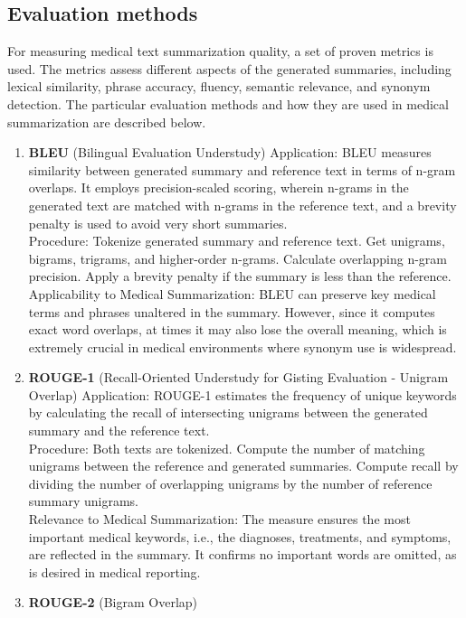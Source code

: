 \subsection{Evaluation methods}
For measuring medical text summarization quality, a set of proven metrics is used. The metrics assess different aspects of the generated summaries, including lexical similarity, phrase accuracy, fluency, semantic relevance, and synonym detection. The particular evaluation methods and how they are used in medical summarization are described below.
\begin{enumerate}

\item \textbf{BLEU} (Bilingual Evaluation Understudy)
Application: BLEU measures similarity between generated summary and reference text in terms of n-gram overlaps. It employs precision-scaled scoring, wherein n-grams in the generated text are matched with n-grams in the reference text, and a brevity penalty is used to avoid very short summaries.
\\
Procedure:
Tokenize generated summary and reference text.
Get unigrams, bigrams, trigrams, and higher-order n-grams.
Calculate overlapping n-gram precision.
Apply a brevity penalty if the summary is less than the reference.
\\
Applicability to Medical Summarization: BLEU can preserve key medical terms and phrases unaltered in the summary. However, since it computes exact word overlaps, at times it may also lose the overall meaning, which is extremely crucial in medical environments where synonym use is widespread.
\\
    \item \textbf{ROUGE-1} (Recall-Oriented Understudy for Gisting Evaluation - Unigram Overlap)
Application: ROUGE-1 estimates the frequency of unique keywords by calculating the recall of intersecting unigrams between the generated summary and the reference text.
\\
Procedure:
Both texts are tokenized.
Compute the number of matching unigrams between the reference and generated summaries.
Compute recall by dividing the number of overlapping unigrams by the number of reference summary unigrams.
\\
Relevance to Medical Summarization: The measure ensures the most important medical keywords, i.e., the diagnoses, treatments, and symptoms, are reflected in the summary. It confirms no important words are omitted, as is desired in medical reporting.
\\
    \item \textbf{ROUGE-2} (Bigram Overlap)

\end{enumerate}
